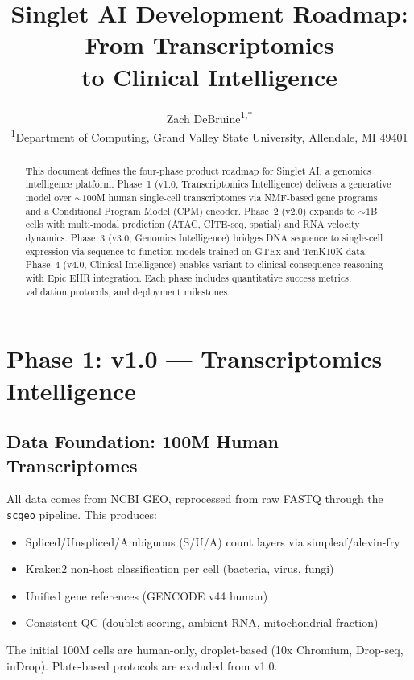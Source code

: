\documentclass[10pt,twocolumn,letterpaper]{article}
\title{Singlet AI Development Roadmap: From Transcriptomics \\
  to Clinical Intelligence}
\author{
  Zach DeBruine\textsuperscript{1,*}
  \\[6pt]
  \textsuperscript{1}Department of Computing, Grand Valley State University, Allendale, MI 49401
}
\begin{document}
\maketitle
{}

\begin{abstract}
This document defines the four-phase product roadmap for Singlet AI, a
genomics intelligence platform. Phase~1 (v1.0, Transcriptomics Intelligence)
delivers a generative model over ${\sim}100$M human single-cell transcriptomes
via NMF-based gene programs and a Conditional Program Model (CPM) encoder.
Phase~2 (v2.0) expands to ${\sim}1$B cells with multi-modal prediction
(ATAC, CITE-seq, spatial) and RNA velocity dynamics. Phase~3 (v3.0, Genomics
Intelligence) bridges DNA sequence to single-cell expression via
sequence-to-function models trained on GTEx and TenK10K data. Phase~4 (v4.0,
Clinical Intelligence) enables variant-to-clinical-consequence reasoning with
Epic EHR integration. Each phase includes quantitative success metrics,
validation protocols, and deployment milestones.
\end{abstract}

\section{Phase 1: v1.0 --- Transcriptomics Intelligence}

\subsection{Data Foundation: 100M Human Transcriptomes}

All data comes from NCBI GEO, reprocessed from raw FASTQ through the
\texttt{scgeo} pipeline. This produces:
\begin{itemize}
  \item Spliced/Unspliced/Ambiguous (S/U/A) count layers via simpleaf/alevin-fry
  \item Kraken2 non-host classification per cell (bacteria, virus, fungi)
  \item Unified gene references (GENCODE v44 human)
  \item Consistent QC (doublet scoring, ambient RNA, mitochondrial fraction)
\end{itemize}

The initial 100M cells are human-only, droplet-based (10x Chromium, Drop-seq,
inDrop). Plate-based protocols are excluded from v1.0.
\end{document}
